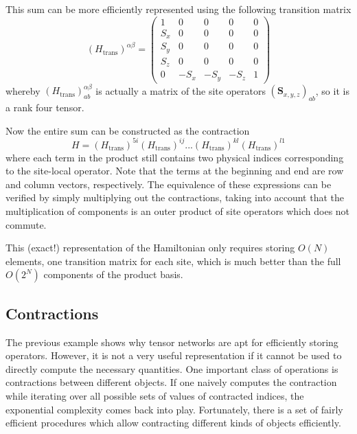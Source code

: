 \documentclass[a4paper,oneside, 11pt,english,listof=totoc,bibliography=totoc]{scrbook}
\begin{document}
This sum can be more efficiently represented using the following transition matrix
\begin{equation}\label{eq:transition}
    (H_\mathrm{trans})^{\alpha\beta}=\begin{pmatrix}
        1 & 0 & 0 & 0 & 0 \\
        S_x & 0 & 0 & 0 & 0 \\
        S_y & 0 & 0 & 0 & 0 \\
        S_z & 0 & 0 & 0 & 0 \\
        0 & -S_x & -S_y & -S_z & 1
    \end{pmatrix}
\end{equation}
whereby $(H_\mathrm{trans})^{\alpha\beta}_{ab}$ is actually a matrix of the site operators $(\mathbf{S}_{x,y,z})_{ab}$, so it is a rank four tensor.

Now the entire sum can be constructed as the contraction
\begin{equation}\label{eq:mpo}
    H=(H_\mathrm{trans})^{5i} (H_\mathrm{trans})^{ij}...(H_\mathrm{trans})^{kl} (H_\mathrm{trans})^{l1}
\end{equation}
where each term in the product still contains two physical indices corresponding to the site-local operator. Note that the terms at the beginning and end are row and column vectors, respectively. The equivalence of these expressions can be verified by simply multiplying out the contractions, taking into account that the multiplication of components is an outer product of site operators which does not commute.

This (exact!) representation of the Hamiltonian only requires storing $O(N)$ elements, one transition matrix for each site, which is much better than the full $O(2^N)$ components of the product basis.

\subsection{Contractions}
The previous example shows why tensor networks are apt for efficiently storing operators. However, it is not a very useful representation if it cannot be used to directly compute the necessary quantities. One important class of operations is contractions between different objects. If one naively computes the contraction while iterating over all possible sets of values of contracted indices, the exponential complexity comes back into play. Fortunately, there is a set of fairly efficient procedures which allow contracting different kinds of objects efficiently.
\end{document}
